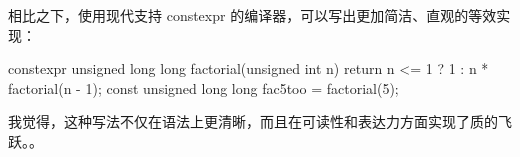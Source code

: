 相比之下，使用现代支持 constexpr 的编译器，可以写出更加简洁、直观的等效实现：

\begin{cpp}
constexpr unsigned long long factorial(unsigned int n) {
  return n <= 1 ? 1 : n * factorial(n - 1);
}
const unsigned long long fac5too = factorial(5);
\end{cpp}

我觉得，这种写法不仅在语法上更清晰，而且在可读性和表达力方面实现了质的飞跃。。






















